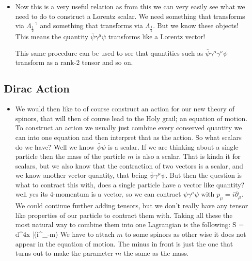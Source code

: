 \documentclass[11pt]{article}
\renewenvironment{flalign}{\vspace{-3mm}\empheq[box=\tcbhighmath]{align}}{\endempheq}
\numberwithin{equation}{section}
\begin{document}
\begin{itemize}
   \item 
   Now this is a very useful relation as from this we can very easily see what we need to do to construct a Lorentz scalar. We need something that transforms via $\Lambda_{\frac{1}{2}}^{-1}$ and something that transforms via $\Lambda_{\frac{1}{2}}$. But we know these objects! This means the quantity $\bar{\psi}\gamma^{\mu}\psi$ transforms like a Lorentz vector! 

   This same procedure can be used to see that quantities such as $\bar{\psi}\gamma^{\mu}\gamma^{\nu}\psi$ transform as a rank-2 tensor and so on. 
\end{itemize}
\subsection{Dirac Action}
\begin{itemize}
  \item We would then like to of course construct an action for our new theory of spinors, that will then of course lead to the Holy grail; an equation of motion. To construct an action we usually just combine every conserved quantity we can into one equation and then interpret that as the action. So what scalars do we have? Well we know $\bar{\psi}\psi$ is a scalar. If we are thinking about a single particle then the mass of the particle $m$ is also a scalar. That is kinda it for scalars, but we also know that the contraction of two vectors is a scalar, and we know another vector quantity, that being $\bar{\psi}\gamma^{\mu}\psi$. But then the question is what to contract this with, does a single particle have a vector like quantity? well yes its 4-momentum is a vector, so we can contract $\bar{\psi}\gamma^{\mu}\psi$ with $p_{\mu} = i\partial_{\mu}$. We could continue further adding tensors, but we don't really have any tensor like properties of our particle to contract them with. Taking all these the most natural way to combine them into one Lagrangian is the following:
  \begin{flalign}
  \label{D_act}
    S = \int d^4x \bar{\psi}(i\gamma^{\mu}\partial_{\mu}-m)\psi 
  \end{flalign}
  We have to attach $m$ to some spinors as other wise it does not appear in the equation of motion. The minus in front is just the one that turns out to make the parameter $m$ the same as the mass. 
  

\end{itemize}
\end{document}
